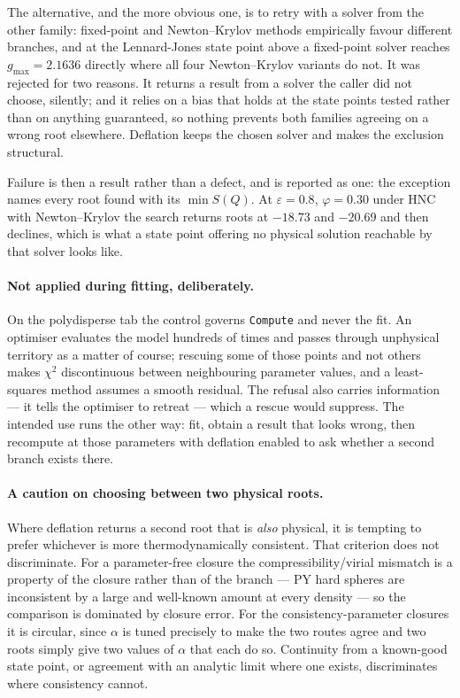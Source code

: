 \documentclass[11pt,a4paper]{article}
\newcommand{\code}[1]{\texttt{\hspace{0pt}#1}}
\begin{document}
The alternative, and the more obvious one, is to retry with a solver from the
other family: fixed-point and Newton--Krylov methods empirically favour
different branches, and at the Lennard-Jones state point above a fixed-point
solver reaches $g_{\max} = 2.1636$ directly where all four Newton--Krylov
variants do not. It was rejected for two reasons. It returns a result from a
solver the caller did not choose, silently; and it relies on a bias that
holds at the state points tested rather than on anything guaranteed, so
nothing prevents both families agreeing on a wrong root elsewhere. Deflation
keeps the chosen solver and makes the exclusion structural.

Failure is then a result rather than a defect, and is reported as one: the
exception names every root found with its $\min S(Q)$. At $\varepsilon = 0.8$,
$\varphi = 0.30$ under HNC with Newton--Krylov the search returns roots at
$-18.73$ and $-20.69$ and then declines, which is what a state point offering
no physical solution reachable by that solver looks like.

\paragraph{Not applied during fitting, deliberately.} On the polydisperse tab
the control governs \code{Compute} and never the fit. An optimiser evaluates
the model hundreds of times and passes through unphysical territory as a
matter of course; rescuing some of those points and not others makes
$\chi^2$ discontinuous between neighbouring parameter values, and a
least-squares method assumes a smooth residual. The refusal also carries
information --- it tells the optimiser to retreat --- which a rescue would
suppress. The intended use runs the other way: fit, obtain a result that
looks wrong, then recompute at those parameters with deflation enabled to ask
whether a second branch exists there.

\paragraph{A caution on choosing between two physical roots.} Where deflation
returns a second root that is \emph{also} physical, it is tempting to prefer
whichever is more thermodynamically consistent. That criterion does not
discriminate. For a parameter-free closure the compressibility/virial
mismatch is a property of the closure rather than of the branch --- PY hard
spheres are inconsistent by a large and well-known amount at every density
--- so the comparison is dominated by closure error. For the
consistency-parameter closures it is circular, since $\alpha$ is tuned
precisely to make the two routes agree and two roots simply give two values
of $\alpha$ that each do so. Continuity from a known-good state point, or
agreement with an analytic limit where one exists, discriminates where
consistency cannot.
\end{document}
